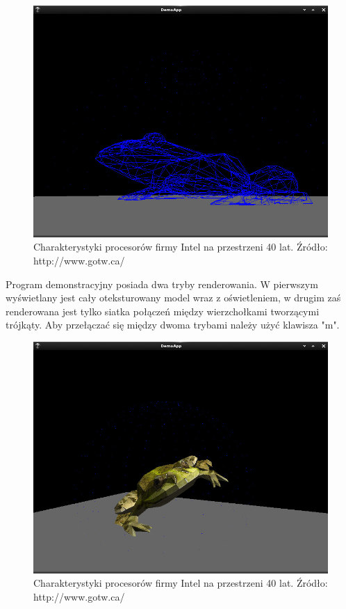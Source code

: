 \begin{figure}[H]
\centering
\includegraphics[scale=0.5]{images/z2.jpg}
\caption{Charakterystyki procesorów firmy Intel na przestrzeni 40 lat. Źródło: http://www.gotw.ca/}
\end{figure}

Program demonstracyjny posiada dwa tryby renderowania. W pierwszym wyświetlany
jest cały oteksturowany model wraz z oświetleniem, w drugim zaś renderowana jest
tylko siatka połączeń między wierzchołkami tworzącymi trójkąty. Aby przełączać
się między dwoma trybami należy użyć klawisza "m".

\begin{figure}[H]
\centering
\includegraphics[scale=0.5]{images/z3.jpg}
\caption{Charakterystyki procesorów firmy Intel na przestrzeni 40 lat. Źródło: http://www.gotw.ca/}
\end{figure}

